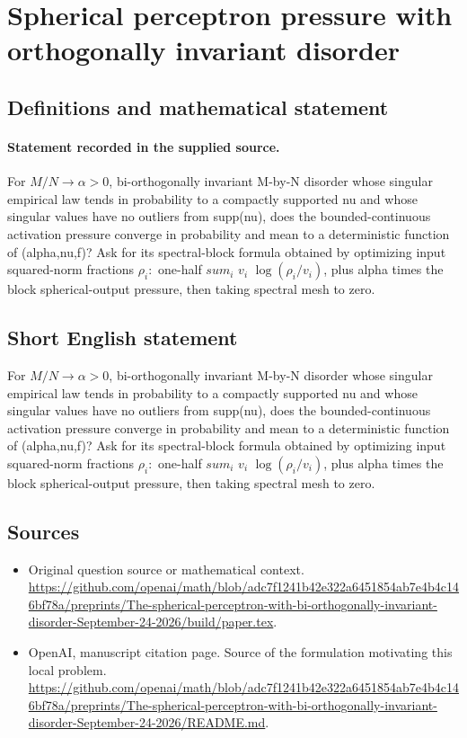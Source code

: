 \documentclass[11pt]{article}
\begin{document}
\section*{Spherical perceptron pressure with orthogonally invariant disorder}\label{statement}
\subsection{Definitions and mathematical statement}
\paragraph{Statement recorded in the supplied source.}
For $M/N\to \alpha >0$, bi-orthogonally invariant M-by-N disorder whose singular empirical law tends in probability to a compactly supported nu and whose singular values have no outliers from supp(nu), does the bounded-continuous activation pressure converge in probability and mean to a deterministic function of (alpha,nu,f)? Ask for its spectral-block formula obtained by optimizing input squared-norm fractions $\rho _i:$ one-half $sum_i$ $v_i$ $\log (\rho _i/v_i)$, plus alpha times the block spherical-output pressure, then taking spectral mesh to zero.
\subsection{Short English statement}
For $M/N\to \alpha >0$, bi-orthogonally invariant M-by-N disorder whose singular empirical law tends in probability to a compactly supported nu and whose singular values have no outliers from supp(nu), does the bounded-continuous activation pressure converge in probability and mean to a deterministic function of (alpha,nu,f)? Ask for its spectral-block formula obtained by optimizing input squared-norm fractions $\rho _i:$ one-half $sum_i$ $v_i$ $\log (\rho _i/v_i)$, plus alpha times the block spherical-output pressure, then taking spectral mesh to zero.
\subsection{Sources}
\begin{itemize}
\item[S1] Original question source or mathematical context.
\url{https://github.com/openai/math/blob/adc7f1241b42e322a6451854ab7e4b4c146bf78a/preprints/The-spherical-perceptron-with-bi-orthogonally-invariant-disorder-September-24-2026/build/paper.tex}.
\item[S2] OpenAI, manuscript citation page. Source of the formulation motivating this local problem.
\url{https://github.com/openai/math/blob/adc7f1241b42e322a6451854ab7e4b4c146bf78a/preprints/The-spherical-perceptron-with-bi-orthogonally-invariant-disorder-September-24-2026/README.md}.
\end{itemize}
\end{document}
